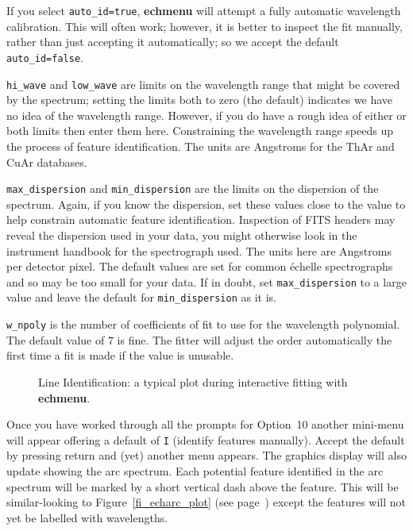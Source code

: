 \documentclass[twoside,11pt]{article}
\newcommand{\xref}[3]{#1}
\newcommand{\scspec}[2]{#1}
\newcommand{\scspec}[2]{#2}
\begin{document}
If you select
\xref{{\tt auto\_id=true}}{sun152}{par_AUTO_ID},
{\bf echmenu} will attempt a fully automatic wavelength calibration.
This will often work; however, it is better to
inspect the fit manually, rather than just accepting it automatically;
so we accept the default \verb+auto_id=false+\@.

\xref{{\tt hi\_wave}}{sun152}{par_HI_WAVE} and
\xref{{\tt low\_wave}}{sun152}{par_LOW_WAVE} are limits on the wavelength
range that might be covered by the spectrum; setting the limits both to
zero (the default) indicates we have no idea of the wavelength range.
However, if you do have a rough idea of either or both limits then enter
them here.
Constraining the wavelength range speeds up the process of feature
identification.
The units are Angstroms for the ThAr and CuAr databases.

\xref{{\tt max\_dispersion}}{sun152}{par_MAX_DISPERSION} and
\xref{{\tt min\_dispersion}}{sun152}{par_MIN_DISPERSION} are the limits on the
dispersion of the spectrum.  Again, if you know the dispersion, set these
values close to the value to help constrain automatic feature identification.
Inspection of FITS headers may reveal the dispersion used in your data,
you might otherwise look in the instrument handbook for the spectrograph
used.
The units here are Angstroms per detector pixel.  The default values are
set for common \'{e}chelle spectrographs and so may be too small for your
data.  If in doubt, set \verb+max_dispersion+ to a large value and leave
the default for \verb+min_dispersion+ as it is.

\xref{{\tt w\_npoly}}{sun152}{par_W_NPOLY} is the number of coefficients
of fit to use for the wavelength polynomial.
The default value of 7 is fine.
The fitter will adjust the order automatically the first time a fit is
made if the value is unusable.

\begin{htmlonly}
\begin{figure}
\begin{center}
  \leavevmode\epsfysize=136mm

  \parbox{140mm}{
    \caption{Line Identification: a typical plot during interactive fitting
             with \xref{{\bf echmenu}}{sun152}{}.}
    \label{fi_echarc_plot_again}
  }
\end{center}
\end{figure}
\end{htmlonly}

Once you have worked through all the prompts for Option~10 another mini-menu
will appear offering a default of \verb+I+ (identify features manually).
Accept the default by pressing return and (yet) another menu appears.  The
graphics display will also update showing the arc spectrum.  Each potential
feature identified in the arc spectrum will be marked by a short vertical
dash above the feature.  This will be similar-looking to
\scspec{Figure~\ref{fi_echarc_plot} (see page~\pageref{fi_echarc_plot})}
{the figure above,} except the features
will not yet be labelled with wavelengths.
\end{document}

